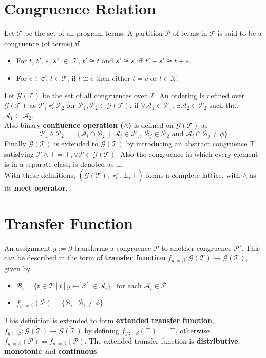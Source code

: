 \section{Congruence Relation}
\label{sec:CongruenceRelation}
Let $\mathcal T$ be the set of all program terms. A partition $\mathcal P$ of terms 
in $\mathcal T$ is said to be a congruence (of terms) if 
\begin{itemize} \tightlist
    \item For $t$, $t'$, $s$, $s'$ $\in$ $\mathcal T$, $t' \cong t$ and $s' \cong s$ iff $t' + s' \cong t + s$. 
    \item For $c \in \mathcal C$, $t \in \mathcal T$, if $t \cong c$ then either $t = c$ or $t \in \mathcal X$.
\end{itemize}
Let $\mathcal G(\mathcal T)$ be the set of all congruences over $\mathcal T$. 
An ordering is defined over $\mathcal G(\mathcal T)$ as $\mathcal P_1 \preceq \mathcal P_2$ for $\mathcal P_1, \mathcal P_2 \in \mathcal G(\mathcal T)$, if 
$\forall \mathcal A_1 \in \mathcal P_1, \ \exists \mathcal A_2 \in \mathcal P_2$ 
such that $\mathcal A_1 \subseteq \mathcal A_2$. \\
Also binary \textbf{confluence operation ($\land$)} is defined on $\mathcal G(\mathcal T)$ as
$$\mathcal P_1 \land \mathcal P_2\ =\ \{\mathcal A_i \cap \mathcal B_j\ \mid\ \mathcal A_i \in \mathcal P_1,\ \mathcal B_j \in \mathcal P_2 \text{ and } \mathcal A_i \cap \mathcal B_j \neq \phi\}$$
Finally $\mathcal G(\mathcal T)$ is extended to $\overline{\mathcal G(\mathcal T)}$ 
by introducing an abstract congruence $\top$ satisfying 
$\mathcal P \land \top = \top, \forall \mathcal P \in \overline{\mathcal G(\mathcal T)}$.
Also the congruence in which every element is in a separate class, is denoted as 
$\bot$.\\ 
With these definitions, $(\overline{\mathcal G(\mathcal T)}, \preceq, \bot, \top)$ 
forms a complete lattice, with $\land$ as its \textbf{meet operator}.

\section{Transfer Function}
\label{sec:TransferFunction}
An assignment $y := \beta$ transforms a congruence $\mathcal P$ to another 
congruence $\mathcal P'$. This can be described in the form of \textbf{transfer function} 
$f_{y := \beta}:\mathcal G(\mathcal T) \to \mathcal G(\mathcal T)$, given by
\begin{itemize} \tightlist
    \item $\mathcal B_i = \{t \in \mathcal T\ |\ t[y \leftarrow \beta] \in \mathcal A_i\}, \text{ for each } \mathcal A_i \in \mathcal P$
    \item $f_{y := \beta}(\mathcal P) = \{\mathcal B_i\ | \ \mathcal B_i \neq \phi\}$
\end{itemize}
This definition is extended to form \textbf{extended transfer function}, 
$\overline{f}_{y := \beta} : \overline{\mathcal G(\mathcal T)} \to \overline{\mathcal G(\mathcal T)}$ 
by defining $\overline{f}_{y := \beta}(\top)\ =\ \top$, otherwise 
$\overline{f}_{y := \beta}(\mathcal P) = f_{y := \beta}(\mathcal P)$.
The extended transfer function is \textbf{distributive}, \textbf{monotonic} and 
\textbf{continuous}.

